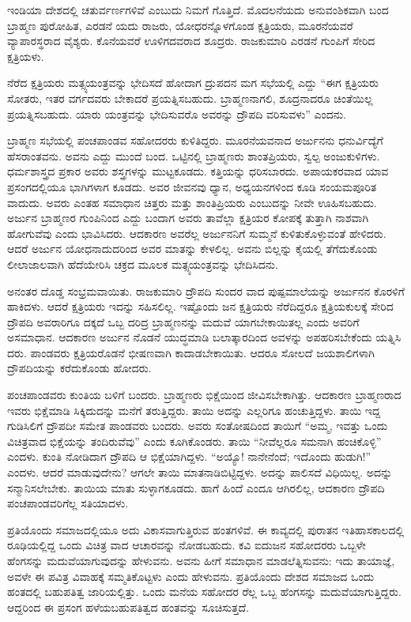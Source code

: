ಇಂಡಿಯಾ ದೇಶದಲ್ಲಿ ಚತುರ್ವರ್ಣಗಳಿವೆ ಎಂಬುದು ನಿಮಗೆ ಗೊತ್ತಿದೆ. ಮೊದಲನೆಯದು ಅನುವಂಶಿಕವಾಗಿ ಬಂದ ಬ್ರಾಹ್ಮಣ ಪುರೋಹಿತ, ಎರಡನೆ ಯದು ರಾಜರು, ಯೋಧರನ್ನೊಳಗೊಂಡ ಕ್ಷತ್ರಿಯರು, ಮೂರನೆಯವರೆ ವ್ಯಾಪಾರಸ್ಥರಾದ ವೈಶ್ಯರು. ಕೊನೆಯವರೆ ಊಳಿಗದವರಾದ ಶೂದ್ರರು. ರಾಜಕುಮಾರಿ ಎರಡನೆ ಗುಂಪಿಗೆ ಸೇರಿದ ಕ್ಷತ್ರಿಯಳು.

ನೆರೆದ ಕ್ಷತ್ರಿಯರು ಮತ್ಸ್ಯಯಂತ್ರವನ್ನು ಭೇದಿಸದೆ ಹೋದಾಗ ದ್ರುಪದನ ಮಗ ಸಭೆಯಲ್ಲಿ ಎದ್ದು “ಈಗ ಕ್ಷತ್ರಿಯರು ಸೋತರು, ಇತರ ವರ್ಗದವರು ಬೇಕಾದರೆ ಪ್ರಯತ್ನಿಸಬಹುದು. ಬ್ರಾಹ್ಮಣನಾಗಲಿ, ಶೂದ್ರನಾದರೂ ಚಿಂತೆಯಿಲ್ಲ ಪ್ರಯತ್ನಿಸಬಹುದು. ಯಾರು ಯಂತ್ರವನ್ನು ಭೇದಿಸುವರೊ ಅವರನ್ನು ದ್ರೌಪದಿ ವರಿಸುವಳು” ಎಂದನು.

ಬ್ರಾಹ್ಮಣ ಸಭೆಯಲ್ಲಿ ಪಂಚಪಾಂಡವ ಸಹೋದರರು ಕುಳಿತಿದ್ದರು. ಮೂರನೆಯವನಾದ ಅರ್ಜುನನು ಧನುರ್ವಿದ್ಯೆಗೆ ಹೆಸರಾಂತವನು. ಅವನು ಎದ್ದು ಮುಂದೆ ಬಂದ. ಒಟ್ಟಿನಲ್ಲಿ ಬ್ರಾಹ್ಮಣರು ಶಾಂತಪ್ರಿಯರು, ಸ್ವಲ್ಪ ಅಂಜುಕುಳಿಗಳು. ಧರ್ಮಶಾಸ್ತ್ರದ ಪ್ರಕಾರ ಅವರು ಶಸ್ತ್ರಗಳನ್ನು ಮುಟ್ಟಕೂಡದು. ಕತ್ತಿಯನ್ನು ಧರಿಸಬಾರದು. ಅಪಾಯಕರವಾದ ಯಾವ ಪ್ರಸಂಗದಲ್ಲಿಯೂ ಭಾಗಿಗಳಾಗ ಕೂಡದು. ಅವರ ಜೀವನವು ಧ್ಯಾನ, ಅಧ್ಯಯನಗಳಿಂದ ಕೂಡಿ ಸಂಯಮಪೂರಿತ ವಾದುದು. ಅವರು ಎಂತಹ ಸಮಾಧಾನ ಚಿತ್ತರು ಮತ್ತು ಶಾಂತಿಪ್ರಿಯರು ಎಂಬುದನ್ನು ನೀವೇ ಊಹಿಸಬಹುದು. ಅರ್ಜುನ ಬ್ರಾಹ್ಮಣರ ಗುಂಪಿನಿಂದ ಎದ್ದು ಬಂದಾಗ ಅವರು ತಾವೆಲ್ಲಾ ಕ್ಷತ್ರಿಯರ ಕೋಪಕ್ಕೆ ತುತ್ತಾಗಿ ನಾಶವಾಗಿ ಹೋಗುವೆವು ಎಂದು ಭಾವಿಸಿದರು. ಆದಕಾರಣ ಅವರೆಲ್ಲ ಅರ್ಜುನನಿಗೆ ಸುಮ್ಮನೆ ಕುಳಿತುಕೊಳ್ಳುವಂತೆ ಹೇಳಿದರು. ಆದರೆ ಅರ್ಜುನ ಯೋಧನಾದುದರಿಂದ ಅವರ ಮಾತನ್ನು ಕೇಳಲಿಲ್ಲ. ಅವನು ಬಿಲ್ಲನ್ನು ಕೈಯಲ್ಲಿ ತೆಗೆದುಕೊಂಡು ಲೀಲಾಜಾಲವಾಗಿ ಹೆದೆಯೇರಿಸಿ ಚಕ್ರದ ಮೂಲಕ ಮತ್ಸ್ಯಯಂತ್ರವನ್ನು ಭೇದಿಸಿದನು.

ಅನಂತರ ದೊಡ್ಡ ಸಂಭ್ರಮವಾಯಿತು. ರಾಜಕುಮಾರಿ ದ್ರೌಪದಿ ಸುಂದರ ವಾದ ಪುಷ್ಪಮಾಲೆಯನ್ನು ಅರ್ಜುನನ ಕೊರಳಿಗೆ ಹಾಕಿದಳು. ಆದರೆ ಕ್ಷತ್ರಿಯರು ಇದನ್ನು ಸಹಿಸಲಿಲ್ಲ. ಇಷ್ಟೊಂದು ಜನ ಕ್ಷತ್ರಿಯರು ನೆರೆದಿದ್ದರೂ ಕ್ಷತ್ರಿಯಕುಲಕ್ಕೆ ಸೇರಿದ ದ್ರೌಪದಿ ಅವರಾರಿಗೂ ದಕ್ಕದೆ ಒಬ್ಬ ದರಿದ್ರ ಬ್ರಾಹ್ಮಣನನ್ನು ಮದುವೆ ಯಾಗಬೇಕಾಯಿತಲ್ಲ ಎಂದು ಅವರಿಗೆ ಅಸಮಾಧಾನ. ಆದಕಾರಣ ಅರ್ಜುನ ನೊಡನೆ ಯುದ್ಧಮಾಡಿ ಬಲಾತ್ಕಾರದಿಂದ ಅವಳನ್ನು ಅಪಹರಿಸಬೇಕೆಂದು ಯತ್ನಿಸಿ ದರು. ಪಾಂಡವರು ಕ್ಷತ್ರಿಯರೊಡನೆ ಭೀಷಣವಾಗಿ ಕಾದಾಡಬೇಕಾಯಿತು. ಆದರೂ ಸೋಲದೆ ಜಯಶಾಲಿಗಳಾಗಿ ದ್ರೌಪದಿಯನ್ನು ಕರೆದುಕೊಂಡು ಹೋದರು.

ಪಂಚಪಾಂಡವರು ಕುಂತಿಯ ಬಳಿಗೆ ಬಂದರು. ಬ್ರಾಹ್ಮಣರು ಭಿಕ್ಷೆಯಿಂದ ಜೀವಿಸಬೇಕಾಗಿತ್ತು. ಆದಕಾರಣ ಬ್ರಾಹ್ಮಣರಾದ ಇವರು ಭಿಕ್ಷೆಮಾಡಿ ಸಿಕ್ಕಿದುದನ್ನು ಮನೆಗೆ ತರುತ್ತಿದ್ದರು. ತಾಯಿ ಅದನ್ನು ಎಲ್ಲರಿಗೂ ಹಂಚುತ್ತಿದ್ದಳು. ತಾಯಿ ಇದ್ದ ಗುಡಿಸಿಲಿಗೆ ದ್ರೌಪದೀ ಸಮೇತ ಪಾಂಡವರು ಬಂದರು. ಅವರು ಸಂತೋಷದಿಂದ ತಾಯಿಗೆ “ಅಮ್ಮ, ಇವತ್ತು ಒಂದು ವಿಚಿತ್ರವಾದ ಭಿಕ್ಷೆಯನ್ನು ತಂದಿರುವೆವು” ಎಂದು ಕೂಗಿಕೊಂಡರು. ತಾಯಿ “ನೀವೆಲ್ಲರೂ ಸಮನಾಗಿ ಹಂಚಿಕೊಳ್ಳಿ” ಎಂದಳು. ಕುಂತಿ ನೋಡಿದಾಗ ದ್ರೌಪದಿ ಆ ಭಿಕ್ಷೆಯಾಗಿದ್ದಳು. “ಅಯ್ಯೊ! ನಾನೇನೆಂದೆ; ಇದೊಂದು ಹುಡುಗಿ!” ಎಂದಳು. ಆದರೆ ಮಾಡುವುದೇನು? ಆಗಲೇ ತಾಯಿ ಮಾತನಾಡಿಬಿಟ್ಟಿದ್ದಳು. ಅದನ್ನು ಪಾಲಿಸದೆ ವಿಧಿಯಿಲ್ಲ. ಅದನ್ನು ಸನ್ಮಾನಿಸಲೇಬೇಕು. ತಾಯಿಯ ಮಾತು ಸುಳ್ಳಾಗಕೂಡದು. ಹಾಗೆ ಹಿಂದೆ ಎಂದೂ ಆಗಿರಲಿಲ್ಲ, ಆದಕಾರಣ ದ್ರೌಪದಿ ಪಂಚಪಾಂಡವರಿಗೆಲ್ಲ ಸತಿಯಾದಳು.

ಪ್ರತಿಯೊಂದು ಸಮಾಜದಲ್ಲಿಯೂ ಅದು ವಿಕಾಸವಾಗುತ್ತಿರುವ ಹಂತಗಳಿವೆ. ಈ ಕಾವ್ಯದಲ್ಲಿ ಪುರಾತನ ಇತಿಹಾಸಕಾಲದಲ್ಲಿ ರೂಢಿಯಲ್ಲಿದ್ದ ಒಂದು ವಿಚಿತ್ರ ವಾದ ಆಚಾರವನ್ನು ನೋಡಬಹುದು. ಕವಿ ಐದುಜನ ಸಹೋದರರು ಒಬ್ಬಳೇ ಹೆಂಗಸನ್ನು ಮದುವೆಯಾಗುವುದನ್ನು ಹೇಳುವನು. ಅವನು ಹೀಗೆ ಸಮಾಧಾನ ಮಾಡಲೆತ್ನಿಸುವನು: ಇದು ತಾಯಾಜ್ಞೆ, ಅವಳೇ ಈ ಪವಿತ್ರ ವಿವಾಹಕ್ಕೆ ಸಮ್ಮತಿಕೊಟ್ಟಳು ಎಂದು ಹೇಳುವನು. ಪ್ರತಿಯೊಂದು ದೇಶದ ಸಮಾಜದ ಒಂದು ಹಂತದಲ್ಲಿ ಬಹುಪತಿತ್ವ ಜಾರಿಯಲ್ಲಿತ್ತು. ಒಂದು ಮನೆಯ ಸಹೋದರ ರೆಲ್ಲ ಒಬ್ಬ ಹೆಂಗಸನ್ನು ಮದುವೆಯಾಗುತ್ತಿದ್ದರು. ಆದ್ದರಿಂದ ಈ ಪ್ರಸಂಗ ಹಳೆಯಬಹುಪತಿತ್ವದ ಹಂತವನ್ನು ಸೂಚಿಸುತ್ತದೆ.

